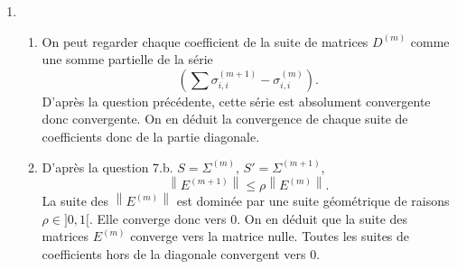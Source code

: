 \begin{enumerate}
 \item
\begin{enumerate}
 \item On peut regarder chaque coefficient de la suite de matrices $D^{(m)}$ comme une somme partielle de la série 
\begin{displaymath}
 \left( \sum \sigma_{i,i}^{(m+1)} - \sigma_{i,i}^{(m)}\right). 
\end{displaymath}
D'après la question précédente, cette série est absolument convergente donc convergente. On en déduit la convergence de chaque suite de coefficients donc de la partie diagonale.

 \item D'après la question 7.b. $S = \Sigma^{(m)}$, $S' = \Sigma^{(m+1)}$,
\begin{displaymath}
 \left\| E^{(m+1)} \right\| \leq \rho \left\| E^{(m)} \right\|.
\end{displaymath}
La suite des $\left\| E^{(m)} \right\|$ est dominée par une suite géométrique de raisons $\rho \in ]0,1[$. Elle converge donc vers $0$. On en déduit que la suite des matrices $E^(m)$ converge vers la matrice nulle. Toutes les suites de coefficients hors de la diagonale convergent vers $0$. 
\end{enumerate}

\end{enumerate}
